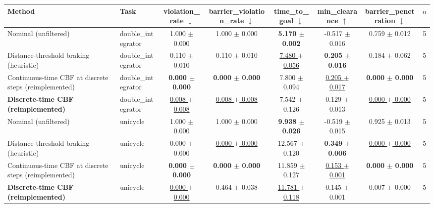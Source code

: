\begin{tabular}{llcccccc}
\toprule
Method & Task & violation\_rate $\downarrow$ & barrier\_violation\_rate $\downarrow$ & time\_to\_goal $\downarrow$ & min\_clearance $\uparrow$ & barrier\_penetration $\downarrow$ & $n$ \\
\midrule
Nominal (unfiltered) & double\_integrator & 1.000 $\pm$ 0.000 & 1.000 $\pm$ 0.000 & \textbf{5.170 $\pm$ 0.002} & -0.517 $\pm$ 0.016 & 0.759 $\pm$ 0.012 & 5 \\
Distance-threshold braking (heuristic) & double\_integrator & 0.110 $\pm$ 0.010 & 0.110 $\pm$ 0.010 & \underline{7.480 $\pm$ 0.056} & \textbf{0.205 $\pm$ 0.016} & 0.184 $\pm$ 0.062 & 5 \\
Continuous-time CBF at discrete steps (reimplemented) & double\_integrator & \textbf{0.000 $\pm$ 0.000} & \textbf{0.000 $\pm$ 0.000} & 7.800 $\pm$ 0.094 & \underline{0.205 $\pm$ 0.017} & \textbf{0.000 $\pm$ 0.000} & 5 \\
\textbf{Discrete-time CBF (reimplemented)} & double\_integrator & \underline{0.008 $\pm$ 0.008} & \underline{0.008 $\pm$ 0.008} & 7.542 $\pm$ 0.126 & 0.129 $\pm$ 0.013 & \underline{0.000 $\pm$ 0.000} & 5 \\
\midrule
Nominal (unfiltered) & unicycle & 1.000 $\pm$ 0.000 & 1.000 $\pm$ 0.000 & \textbf{9.938 $\pm$ 0.026} & -0.519 $\pm$ 0.015 & 0.925 $\pm$ 0.013 & 5 \\
Distance-threshold braking (heuristic) & unicycle & 0.000 $\pm$ 0.000 & \underline{0.000 $\pm$ 0.000} & 12.567 $\pm$ 0.120 & \textbf{0.349 $\pm$ 0.006} & \underline{0.000 $\pm$ 0.000} & 5 \\
Continuous-time CBF at discrete steps (reimplemented) & unicycle & \textbf{0.000 $\pm$ 0.000} & \textbf{0.000 $\pm$ 0.000} & 11.859 $\pm$ 0.127 & \underline{0.153 $\pm$ 0.001} & \textbf{0.000 $\pm$ 0.000} & 5 \\
\textbf{Discrete-time CBF (reimplemented)} & unicycle & \underline{0.000 $\pm$ 0.000} & 0.464 $\pm$ 0.038 & \underline{11.781 $\pm$ 0.118} & 0.145 $\pm$ 0.001 & 0.007 $\pm$ 0.000 & 5 \\
\bottomrule
\end{tabular}
